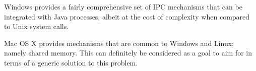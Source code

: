 \documentclass[12pt,a4paper,oneside]{article}
\begin{document}
    Windows provides a fairly comprehensive set of IPC mechanisms that can be integrated with Java processes, albeit at the cost of complexity when compared to Unix system calls.

    Mac OS X provides mechanisms that are common to Windows and Linux; namely shared memory. This can definitely be considered as a goal to aim for in terms of a generic solution to this problem.

\pagebreak


\end{document}
